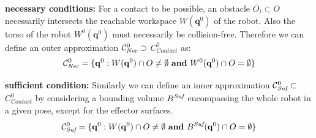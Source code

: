 \documentclass[journal]{IEEEtran}
\providecommand{\DIFaddtex}[1]{#1} %
\providecommand{\DIFdeltex}[1]{} %
\providecommand{\DIFaddbegin}{\protect\color{blue}} %
\providecommand{\DIFaddend}{\protect\color{black}} %
\providecommand{\DIFdelbegin}{\protect\cbdelete} %
\providecommand{\DIFdelend}{} %
\providecommand{\DIFadd}[1]{\texorpdfstring{\DIFaddtex{#1}}{#1}} %
\providecommand{\DIFdel}[1]{\texorpdfstring{\DIFdeltex{#1}}{}} %
\begin{document}
\textbf{necessary conditions:}
For a contact to be possible, an obstacle $O_i \subset O$ necessarily intersects the reachable workspace $W(\mathbf{q}^{0})$ of the robot\DIFdelbegin \DIFdel{(Figure~\ref{fig:contact_gen}--1). }\DIFdelend \DIFaddbegin \DIFadd{. %
 }\DIFaddend Also the torso of the robot $W^0(\mathbf{q}^{0})$ must necessarily be collision-free.
Therefore we can define an outer approximation  $ \mathcal{C}^0_{\textrm{\it Nec}} \supset$ $C_{Contact}^0$ as: 
\begin{equation}
\mathcal{C}^0_{\textrm{\it Nec}} = \{ \mathbf{q}^0 : W(\mathbf{q}^{0}) \cap O \neq \emptyset \textrm{ \textbf{and}}\ W^0(\mathbf{q}^{0}) \cap O = \emptyset \} %
\end{equation}


\textbf{sufficient condition:}
Similarly we can define an inner approximation \mbox{$\mathcal{C}^0_{\textrm{\it Suf}} \subset $ $C_{Contact}^0$} by considering a bounding volume $B^{\textrm{\it Suf}}$ encompassing the whole robot in a given pose, except for the effector surfaces. 
\begin{equation}
\mathcal{C}^0_{\textrm{\it Suf}} = \{ \mathbf{q}^0 : W(\mathbf{q}^{0}) \cap O \neq \emptyset \textrm{ \textbf{and}}\ B^{\textrm{\it Suf}}(\mathbf{q}^{0}) \cap O = \emptyset \} %
\end{equation}

\end{document}
